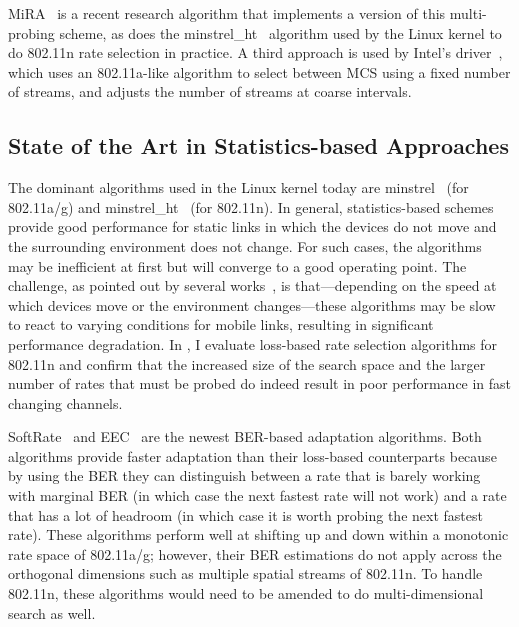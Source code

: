 MiRA~\cite{Pefkianakis_MiRA} is a recent research algorithm that implements a version of this multi-probing scheme, as does the minstrel\_ht~\cite{minstrel_ht} algorithm used by the Linux kernel to do 802.11n rate selection in practice. A third approach is used by Intel's  driver~\cite{iwlwifi}, which uses an 802.11a-like algorithm to select between MCS using a fixed number of streams, and adjusts the number of streams at coarse intervals.

\subsection{State of the Art in Statistics-based Approaches}
The dominant algorithms used in the Linux kernel today are minstrel~\cite{minstrel} (for 802.11a/g) and minstrel\_ht~\cite{minstrel_ht} (for 802.11n).  In general, statistics-based schemes provide good performance for static links in which the devices do not move and the surrounding environment does not change. For such cases, the algorithms may be inefficient at first but will converge to a good operating point. The challenge, as pointed out by several works~\cite{Holland_RBAR,Judd_CHARM,Vutukuru_SoftRate}, is that---depending on the speed at which devices move or the environment changes---these algorithms may be slow to react to varying conditions for mobile links, resulting in significant performance degradation. In , I evaluate loss-based rate selection algorithms for 802.11n and confirm that the increased size of the search space and the larger number of rates that must be probed do indeed result in poor performance in fast changing channels.

SoftRate~\cite{Vutukuru_SoftRate} and EEC~\cite{Chen_EEC} are the newest BER-based adaptation algorithms. Both algorithms provide faster adaptation than their loss-based counterparts because by using the BER they can distinguish between a rate that is barely working with marginal BER (in which case the next fastest rate will not work) and a rate that has a lot of headroom (in which case it is worth probing the next fastest rate). These algorithms perform well at shifting up and down within a monotonic rate space of 802.11a/g; however, their BER estimations do not apply across the orthogonal dimensions such as multiple spatial streams of 802.11n. To handle 802.11n, these algorithms would need to be amended to do multi-dimensional search as well.

